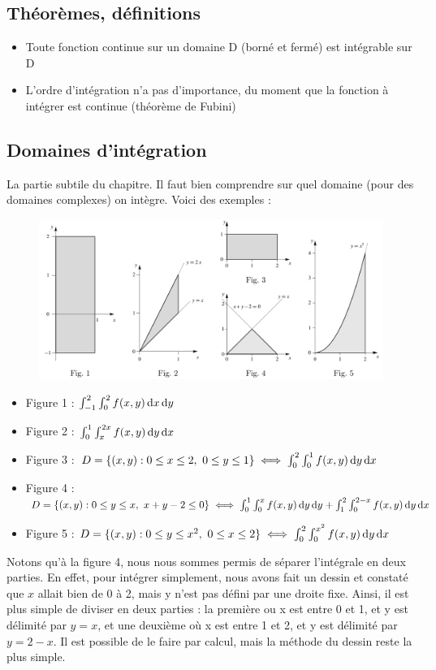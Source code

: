 \documentclass[12pt,a4paper]{article}
\renewcommand{\)}{\right)}
\renewcommand{\(}{\left(}
\begin{document}
\subsection{Théorèmes, définitions}
\begin{itemize}
	\item 	Toute fonction continue sur un domaine D (borné et fermé) est intégrable sur D
	\item 	L'ordre d'intégration n'a pas d'importance, du moment que la fonction à intégrer est continue (théorème de Fubini)
\end{itemize}

\subsection{Domaines d'intégration}
La partie subtile du chapitre. Il faut bien comprendre sur quel domaine (pour des domaines complexes) on intègre. Voici des exemples :
\begin{figure}
	\centering
	\includegraphics[scale=0.45]{domaine}
\end{figure}
\begin{itemize}
	\item 	Figure 1 : $\int_{-1}^2\int_0^2 f(x,y) \, \mathrm d x\, \mathrm d y$
	\item 	Figure 2 : $\int_0^1 \int_x^{2x} f(x,y) \, \mathrm d y\, \mathrm d x$
	\item 	Figure 3 : $D = \{(x,y) : 0 \leq x \leq 2,\ 0 \leq y \leq 1\} \iff \int_0^2 \int_0^1 f(x,y) \, \mathrm d y\, \mathrm d x$
	\item 	Figure 4 : $D = \{(x,y) : 0 \leq y \leq x,\ x+y-2 \leq 0\} \iff \int_0^1\int_0^x f(x,y) \, \mathrm d y\, \mathrm d y + \int_1^2\int_0^{2-x} f(x,y) \, \mathrm d y\, \mathrm d x$
	\item 	Figure 5 : $D = \{(x,y) : 0 \leq y \leq x^2,\ 0 \leq x \leq 2\} \iff \int_0^2 \int_0^{x^2} f(x,y) \, \mathrm d y\, \mathrm d x$
\end{itemize}
Notons qu'à la figure 4, nous nous sommes permis de séparer l'intégrale en deux parties. En effet, pour intégrer simplement, nous avons fait un dessin et constaté que $x$ allait bien de 0 à 2, mais y n'est pas défini par une droite fixe. Ainsi, il est plus simple de diviser en deux parties : la première ou x est entre 0 et 1, et y est délimité par $y=x$, et une deuxième où x est entre 1 et 2, et y est délimité par $y = 2-x$. Il est possible de le faire par calcul, mais la méthode du dessin reste la plus simple.	
\end{document}
